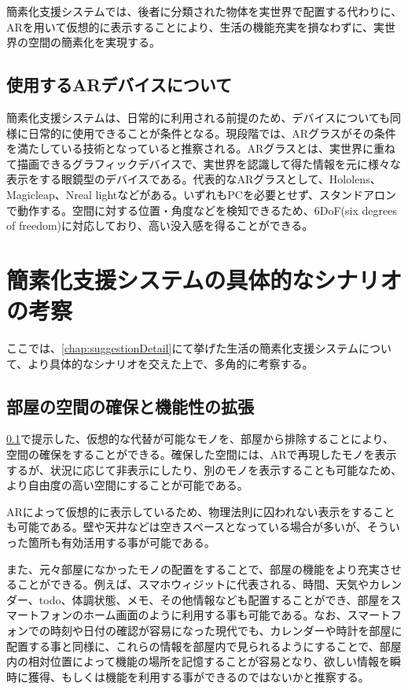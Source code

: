 簡素化支援システムでは、後者に分類された物体を実世界で配置する代わりに、ARを用いて仮想的に表示することにより、生活の機能充実を損なわずに、実世界の空間の簡素化を実現する。

\subsection{使用するARデバイスについて}
\label{chap:ARdevice}

簡素化支援システムは、日常的に利用される前提のため、デバイスについても同様に日常的に使用できることが条件となる。現段階では、ARグラスがその条件を満たしている技術となっていると推察される。ARグラスとは、実世界に重ねて描画できるグラフィックデバイスで、実世界を認識して得た情報を元に様々な表示をする眼鏡型のデバイスである。代表的なARグラスとして、Hololens\cite{hololens}、Magicleap\cite{Magicleap}、Nreal light\cite{nreallight}などがある。いずれもPCを必要とせず、スタンドアロンで動作する。空間に対する位置・角度などを検知できるため、6DoF(six degrees of freedom)に対応しており、高い没入感を得ることができる。

\newpage

\section{簡素化支援システムの具体的なシナリオの考察}

ここでは、\ref{chap:suggestionDetail}にて挙げた生活の簡素化支援システムについて、より具体的なシナリオを交えた上で、多角的に考察する。

\subsection{部屋の空間の確保と機能性の拡張}

\ref{chap:ARdevice}で提示した、仮想的な代替が可能なモノを、部屋から排除することにより、空間の確保をすることができる。確保した空間には、ARで再現したモノを表示するが、状況に応じて非表示にしたり、別のモノを表示することも可能なため、より自由度の高い空間にすることが可能である。

ARによって仮想的に表示しているため、物理法則に囚われない表示をすることも可能である。壁や天井などは空きスペースとなっている場合が多いが、そういった箇所も有効活用する事が可能である。

また、元々部屋になかったモノの配置をすることで、部屋の機能をより充実させることができる。例えば、スマホウィジットに代表される、時間、天気やカレンダー、todo、体調状態、メモ、その他情報なども配置することができ、部屋をスマートフォンのホーム画面のように利用する事も可能である。なお、スマートフォンでの時刻や日付の確認が容易になった現代でも、カレンダーや時計を部屋に配置する事と同様に、これらの情報を部屋内で見られるようにすることで、部屋内の相対位置によって機能の場所を記憶することが容易となり、欲しい情報を瞬時に獲得、もしくは機能を利用する事ができるのではないかと推察する。

